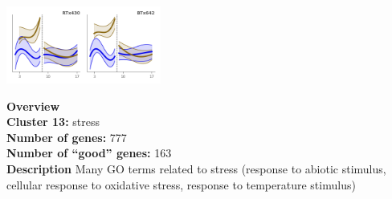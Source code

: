 \begin{multicols}{2}
\includegraphics[width=2in]{figures/clusters/leaf_Preflowering_12.png}
\columnbreak

\noindent \textbf{Overview}\\\textbf{Cluster 13:} stress \\
\textbf{Number of genes:} 777 \\
\textbf{Number of ``good'' genes:} 163 \\
\textbf{Description} Many GO terms related to stress (response to abiotic stimulus, cellular response to oxidative stress, response to temperature stimulus) \\
\end{multicols}

